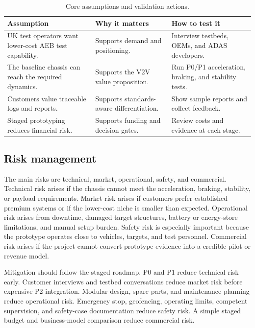 \begin{table}[H]
\centering
\caption{Core assumptions and validation actions.}
\label{tab:assumptions_compact}
\begin{tabular}{p{} p{} p{}}
\toprule
\textbf{Assumption} & \textbf{Why it matters} & \textbf{How to test it} \\
\midrule
UK test operators want lower-cost AEB test capability. & Supports demand and positioning. & Interview testbeds, OEMs, and ADAS developers. \\
The baseline chassis can reach the required dynamics. & Supports the V2V value proposition. & Run P0/P1 acceleration, braking, and stability tests. \\
Customers value traceable logs and reports. & Supports standards-aware differentiation. & Show sample reports and collect feedback. \\
Staged prototyping reduces financial risk. & Supports funding and decision gates. & Review costs and evidence at each stage. \\
\bottomrule
\end{tabular}
\end{table}

\subsection{Risk management}

The main risks are technical, market, operational, safety, and commercial. Technical risk arises if the chassis cannot meet the acceleration, braking, stability, or payload requirements. Market risk arises if customers prefer established premium systems or if the lower-cost niche is smaller than expected. Operational risk arises from downtime, damaged target structures, battery or energy-store limitations, and manual setup burden. Safety risk is especially important because the prototype operates close to vehicles, targets, and test personnel. Commercial risk arises if the project cannot convert prototype evidence into a credible pilot or revenue model.

Mitigation should follow the staged roadmap. P0 and P1 reduce technical risk early. Customer interviews and testbed conversations reduce market risk before expensive P2 integration. Modular design, spare parts, and maintenance planning reduce operational risk. Emergency stop, geofencing, operating limits, competent supervision, and safety-case documentation reduce safety risk. A simple staged budget and business-model comparison reduce commercial risk.

